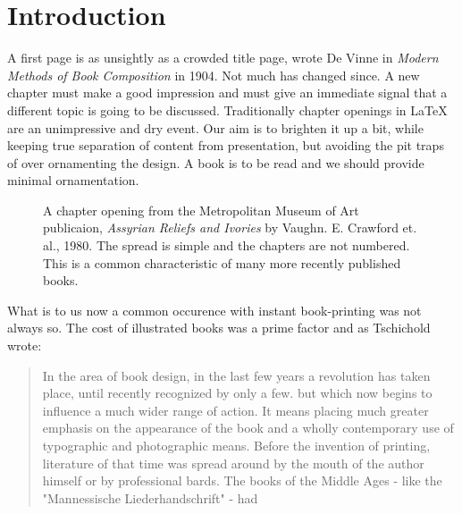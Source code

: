\section*{Introduction}

A  first page is as unsightly as a crowded title page, wrote De Vinne in \emph{Modern Methods of Book Composition} in 1904.  Not much has changed since. A new chapter must make a good impression and must give an immediate signal that a different topic is going to be discussed. Traditionally chapter openings in LaTeX are an unimpressive and dry event. Our aim is to brighten it up a bit, while keeping true separation of content from presentation, but avoiding the pit traps of over ornamenting the design. A book is to be read and we should provide minimal ornamentation. 

%

\begin{figure}[htbp]
\centering
\parindent=0pt
\par
\caption{A chapter opening from the Metropolitan Museum of Art publicaion, \textit{Assyrian Reliefs and Ivories} by Vaughn. E. Crawford et. al., 1980. The spread is simple and the chapters are not numbered. This is a common characteristic of many more recently published books.}
\end{figure}


What is to us now a common occurence with instant book-printing was not always so. The cost of illustrated books was a prime factor and as Tschichold wrote:
\begin{quotation}
In the area of book design, in the last few years a revolution has taken place, until recently recognized by only a few. but which now begins to influence a much wider range of action.
It means placing much greater emphasis on the appearance of the book and a wholly contemporary use of typographic and photographic means. Before the invention of printing, literature of that time was spread around by the mouth of the author himself or by professional bards. The books of the Middle Ages - like the "Mannessische Liederhandschrift" - had
\end{quotation}

